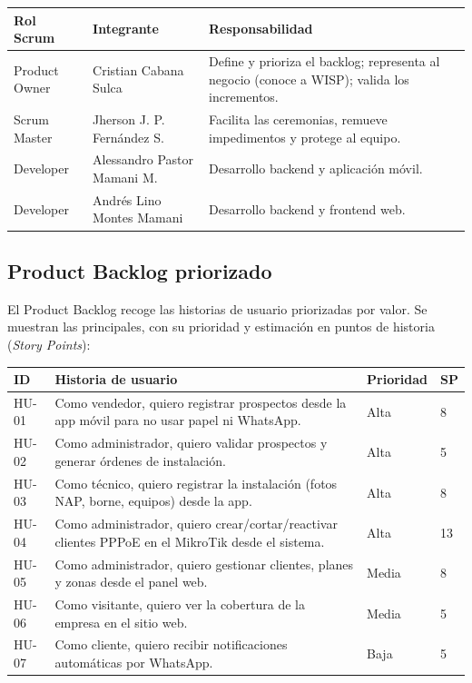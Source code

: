 \begin{center}
\label{tab:roles-scrum}
\begin{tabularx}{\textwidth}{L{2.6cm} L{3.6cm} X}
\toprule
\textbf{Rol Scrum} & \textbf{Integrante} & \textbf{Responsabilidad} \\
\midrule
Product Owner & Cristian Cabana Sulca & Define y prioriza el backlog; representa al
negocio (conoce a WISP); valida los incrementos. \\
Scrum Master & Jherson J. P. Fernández S. & Facilita las ceremonias, remueve
impedimentos y protege al equipo. \\
Developer & Alessandro Pastor Mamani M. & Desarrollo backend y aplicación móvil. \\
Developer & Andrés Lino Montes Mamani & Desarrollo backend y frontend web. \\
\bottomrule
\end{tabularx}
\end{center}

\subsection{Product Backlog priorizado}

El Product Backlog recoge las historias de usuario priorizadas por valor. Se muestran
las principales, con su prioridad y estimación en puntos de historia
(\textit{Story Points}):

\begin{center}
\label{tab:backlog}
\begin{tabularx}{\textwidth}{L{1.6cm} X C{1.8cm} C{1cm}}
\toprule
\textbf{ID} & \textbf{Historia de usuario} & \textbf{Prioridad} & \textbf{SP} \\
\midrule
HU-01 & Como vendedor, quiero registrar prospectos desde la app móvil para no usar
papel ni WhatsApp. & Alta & 8 \\
HU-02 & Como administrador, quiero validar prospectos y generar órdenes de
instalación. & Alta & 5 \\
HU-03 & Como técnico, quiero registrar la instalación (fotos NAP, borne, equipos)
desde la app. & Alta & 8 \\
HU-04 & Como administrador, quiero crear/cortar/reactivar clientes PPPoE en el
MikroTik desde el sistema. & Alta & 13 \\
HU-05 & Como administrador, quiero gestionar clientes, planes y zonas desde el panel
web. & Media & 8 \\
HU-06 & Como visitante, quiero ver la cobertura de la empresa en el sitio web. &
Media & 5 \\
HU-07 & Como cliente, quiero recibir notificaciones automáticas por WhatsApp. &
Baja & 5 \\
\bottomrule
\end{tabularx}
\end{center}


